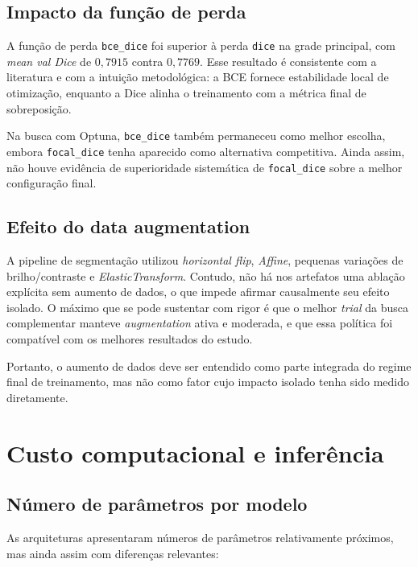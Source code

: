 \documentclass[tcc,capa]{texufpel}
\begin{document}
\subsection{Impacto da função de perda}

A função de perda \texttt{bce\_dice} foi superior à perda \texttt{dice} na grade principal, com \textit{mean val Dice} de \(0{,}7915\) contra \(0{,}7769\). Esse resultado é consistente com a literatura e com a intuição metodológica: a BCE fornece estabilidade local de otimização, enquanto a Dice alinha o treinamento com a métrica final de sobreposição.

Na busca com Optuna, \texttt{bce\_dice} também permaneceu como melhor escolha, embora \texttt{focal\_dice} tenha aparecido como alternativa competitiva. Ainda assim, não houve evidência de superioridade sistemática de \texttt{focal\_dice} sobre a melhor configuração final.

\subsection{Efeito do data augmentation}

A pipeline de segmentação utilizou \textit{horizontal flip}, \textit{Affine}, pequenas variações de brilho/contraste e \textit{ElasticTransform}. Contudo, não há nos artefatos uma ablação explícita sem aumento de dados, o que impede afirmar causalmente seu efeito isolado. O máximo que se pode sustentar com rigor é que o melhor \textit{trial} da busca complementar manteve \textit{augmentation} ativa e moderada, e que essa política foi compatível com os melhores resultados do estudo.

Portanto, o aumento de dados deve ser entendido como parte integrada do regime final de treinamento, mas não como fator cujo impacto isolado tenha sido medido diretamente.

\section{Custo computacional e inferência}

\subsection{Número de parâmetros por modelo}

As arquiteturas apresentaram números de parâmetros relativamente próximos, mas ainda assim com diferenças relevantes:
\end{document}
